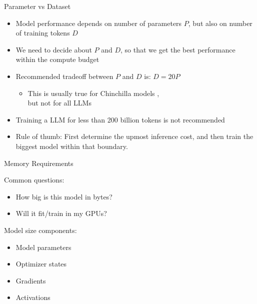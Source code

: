 
\begin{vbframe}{Parameter vs Dataset}

\vfill

\begin{itemize}
    \item Model performance depends on number of parameters $P$, but also on number of training tokens $D$
	\item We need to decide about $P$ and $D$, so that we get the best performance within the compute budget
	\item
        Recommended tradeoff between $P$ and $D$ is: $D = 20 P$
	\begin{itemize}
	    \item This is usually true for Chinchilla models ,\\but not for all LLMs
	\end{itemize}
	\item Training a LLM for less than 200 billion tokens is not recommended
	\item Rule of thumb: First determine the upmost inference cost, and then train the biggest model within that boundary.
\end{itemize}

\vfill

\end{vbframe}


\begin{vbframe}{Memory Requirements}

\vfill

Common questions: \newline

\begin{itemize}
 	\item How big is this model in bytes?
	\item Will it fit/train in my GPUs?
\end{itemize}

\vskip8mm

Model size components: \newline

\begin{itemize}
 	\item Model parameters
	\item Optimizer states
	\item Gradients
	\item Activations
\end{itemize}

\vfill

\end{vbframe}

